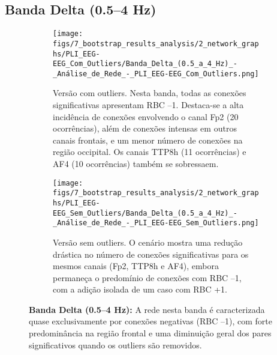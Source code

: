 \subsection{Banda Delta (0.5–4 Hz)}
\begin{figure}[H]
    \centering
    \begin{subfigure}[b]{0.48\textwidth}
        \texttt{[image: figs/7\_bootstrap\_results\_analysis/2\_network\_graphs/PLI\_EEG-EEG\_Com\_Outliers/Banda\_Delta\_(0.5\_a\_4\_Hz)\_-\_Análise\_de\_Rede\_-\_PLI\_EEG-EEG\_Com\_Outliers.png]}
        \caption{\small Versão com outliers. Nesta banda, todas as conexões significativas apresentam RBC –1. Destaca-se a alta incidência de conexões envolvendo o canal Fp2 (20 ocorrências), além de conexões intensas em outros canais frontais, e um menor número de conexões na região occipital. Os canais TTP8h (11 ocorrências) e AF4 (10 ocorrências) também se sobressaem.}
    \end{subfigure}
    \hfill
    \begin{subfigure}[b]{0.48\textwidth}
        \texttt{[image: figs/7\_bootstrap\_results\_analysis/2\_network\_graphs/PLI\_EEG-EEG\_Sem\_Outliers/Banda\_Delta\_(0.5\_a\_4\_Hz)\_-\_Análise\_de\_Rede\_-\_PLI\_EEG-EEG\_Sem\_Outliers.png]}
        \caption{\small Versão sem outliers. O cenário mostra uma redução drástica no número de conexões significativas para os mesmos canais (Fp2, TTP8h e AF4), embora permaneça o predomínio de conexões com RBC –1, com a adição isolada de um caso com RBC +1.}
    \end{subfigure}
    \caption[Análise de Rede – Banda Delta (PLI EEG–EEG)]{\small \textbf{Banda Delta (0.5–4 Hz):} A rede nesta banda é caracterizada quase exclusivamente por conexões negativas (RBC –1), com forte predominância na região frontal e uma diminuição geral dos pares significativos quando os outliers são removidos.}
    \label{fig:rede_delta_pli}
\end{figure}

